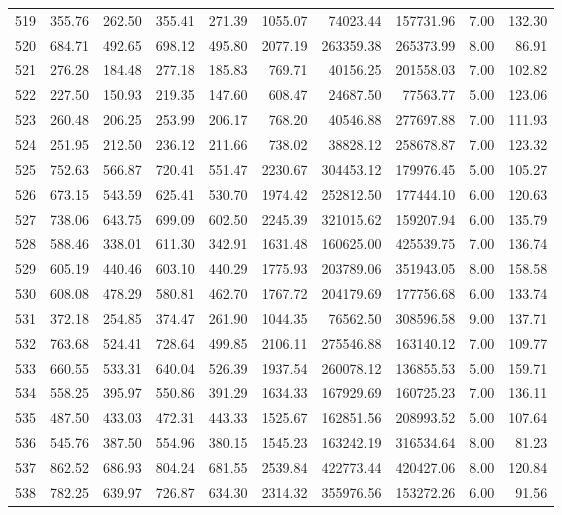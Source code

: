 \begin{tabular}{lrrrrrrrrr}
519 & 355.76 & 262.50 & 355.41 & 271.39 & 1055.07 & 74023.44 & 157731.96 & 7.00 & 132.30 \\
520 & 684.71 & 492.65 & 698.12 & 495.80 & 2077.19 & 263359.38 & 265373.99 & 8.00 & 86.91 \\
521 & 276.28 & 184.48 & 277.18 & 185.83 & 769.71 & 40156.25 & 201558.03 & 7.00 & 102.82 \\
522 & 227.50 & 150.93 & 219.35 & 147.60 & 608.47 & 24687.50 & 77563.77 & 5.00 & 123.06 \\
523 & 260.48 & 206.25 & 253.99 & 206.17 & 768.20 & 40546.88 & 277697.88 & 7.00 & 111.93 \\
524 & 251.95 & 212.50 & 236.12 & 211.66 & 738.02 & 38828.12 & 258678.87 & 7.00 & 123.32 \\
525 & 752.63 & 566.87 & 720.41 & 551.47 & 2230.67 & 304453.12 & 179976.45 & 5.00 & 105.27 \\
526 & 673.15 & 543.59 & 625.41 & 530.70 & 1974.42 & 252812.50 & 177444.10 & 6.00 & 120.63 \\
527 & 738.06 & 643.75 & 699.09 & 602.50 & 2245.39 & 321015.62 & 159207.94 & 6.00 & 135.79 \\
528 & 588.46 & 338.01 & 611.30 & 342.91 & 1631.48 & 160625.00 & 425539.75 & 7.00 & 136.74 \\
529 & 605.19 & 440.46 & 603.10 & 440.29 & 1775.93 & 203789.06 & 351943.05 & 8.00 & 158.58 \\
530 & 608.08 & 478.29 & 580.81 & 462.70 & 1767.72 & 204179.69 & 177756.68 & 6.00 & 133.74 \\
531 & 372.18 & 254.85 & 374.47 & 261.90 & 1044.35 & 76562.50 & 308596.58 & 9.00 & 137.71 \\
532 & 763.68 & 524.41 & 728.64 & 499.85 & 2106.11 & 275546.88 & 163140.12 & 7.00 & 109.77 \\
533 & 660.55 & 533.31 & 640.04 & 526.39 & 1937.54 & 260078.12 & 136855.53 & 5.00 & 159.71 \\
534 & 558.25 & 395.97 & 550.86 & 391.29 & 1634.33 & 167929.69 & 160725.23 & 7.00 & 136.11 \\
535 & 487.50 & 433.03 & 472.31 & 443.33 & 1525.67 & 162851.56 & 208993.52 & 5.00 & 107.64 \\
536 & 545.76 & 387.50 & 554.96 & 380.15 & 1545.23 & 163242.19 & 316534.64 & 8.00 & 81.23 \\
537 & 862.52 & 686.93 & 804.24 & 681.55 & 2539.84 & 422773.44 & 420427.06 & 8.00 & 120.84 \\
538 & 782.25 & 639.97 & 726.87 & 634.30 & 2314.32 & 355976.56 & 153272.26 & 6.00 & 91.56 \\

\end{tabular}
